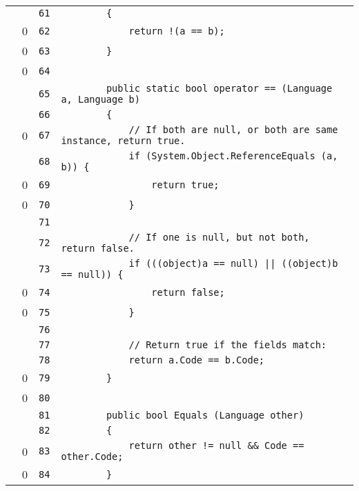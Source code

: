 \documentclass[a4paper,10pt]{article}
\begin{document}
\begin{longtable}[l]{lrrl}
\cellcolor{gray} &  & \verb~61~ & \verb~        {~\\
\cellcolor{red} & 0 & \verb~62~ & \verb~            return !(a == b);~\\
\cellcolor{red} & 0 & \verb~63~ & \verb~        }~\\
\cellcolor{red} & 0 & \verb~64~ & \verb~~\\
\cellcolor{gray} &  & \verb~65~ & \verb~        public static bool operator == (Language a, Language b)~\\
\cellcolor{gray} &  & \verb~66~ & \verb~        {~\\
\cellcolor{red} & 0 & \verb~67~ & \verb~            // If both are null, or both are same instance, return true.~\\
\cellcolor{gray} &  & \verb~68~ & \verb~            if (System.Object.ReferenceEquals (a, b)) {~\\
\cellcolor{red} & 0 & \verb~69~ & \verb~                return true;~\\
\cellcolor{red} & 0 & \verb~70~ & \verb~            }~\\
\cellcolor{gray} &  & \verb~71~ & \verb~~\\
\cellcolor{gray} &  & \verb~72~ & \verb~            // If one is null, but not both, return false.~\\
\cellcolor{gray} &  & \verb~73~ & \verb~            if (((object)a == null) || ((object)b == null)) {~\\
\cellcolor{red} & 0 & \verb~74~ & \verb~                return false;~\\
\cellcolor{red} & 0 & \verb~75~ & \verb~            }~\\
\cellcolor{gray} &  & \verb~76~ & \verb~~\\
\cellcolor{gray} &  & \verb~77~ & \verb~            // Return true if the fields match:~\\
\cellcolor{gray} &  & \verb~78~ & \verb~            return a.Code == b.Code;~\\
\cellcolor{red} & 0 & \verb~79~ & \verb~        }~\\
\cellcolor{red} & 0 & \verb~80~ & \verb~~\\
\cellcolor{gray} &  & \verb~81~ & \verb~        public bool Equals (Language other)~\\
\cellcolor{gray} &  & \verb~82~ & \verb~        {~\\
\cellcolor{red} & 0 & \verb~83~ & \verb~            return other != null && Code == other.Code;~\\
\cellcolor{red} & 0 & \verb~84~ & \verb~        }~\\

\end{longtable}
\end{document}
